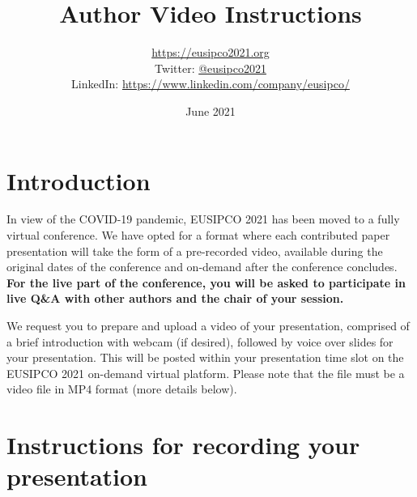 \documentclass[english,a4paper,11pt,oneside,onecolumn]{article}
\title{Author Video Instructions}
\author{
\url{https://eusipco2021.org}\\
Twitter: \href{https://twitter.com/eusipco2021}{ @eusipco2021}\\
LinkedIn: \href{https://www.linkedin.com/company/eusipco/}{https://www.linkedin.com/company/eusipco/}
}
\date{June 2021}
\begin{document}
\maketitle

\section{Introduction}
In view of the COVID-19 pandemic, EUSIPCO 2021 has been moved to a fully virtual conference. We have opted for a format where each contributed paper presentation will take the form of a pre-recorded video, available during the original dates of the conference and on-demand after the conference concludes.
\textbf{For the live part of the conference, you will be asked to participate in live Q\&A with other authors and the  chair of your session. }

We  request you to prepare and upload a video of your presentation, comprised of a brief introduction with webcam (if desired), followed by voice over slides for your presentation. This will be posted within your presentation time slot on the EUSIPCO 2021 on-demand virtual platform. Please note that the file must be a video file in MP4 format (more details below). 

\section{Instructions for recording your presentation}
\end{document}
